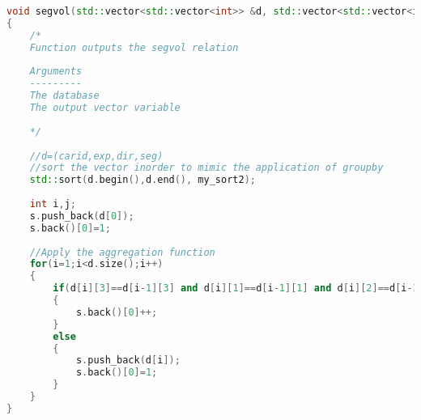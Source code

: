 \begin{lstlisting}[language=C++, caption=Calculating the SegVol relation, label={lst:SegVol}]
void segvol(std::vector<std::vector<int>> &d, std::vector<std::vector<int>> &s)
{   
    /*
    Function outputs the segvol relation
    
    Arguments
    ---------
    The database
    The output vector variable
    
    */
    
    //d=(carid,exp,dir,seg)
    //sort the vector inorder to mimic the application of groupby
    std::sort(d.begin(),d.end(), my_sort2);
    
    int i,j;
    s.push_back(d[0]);
    s.back()[0]=1;
    
    //Apply the aggregation function
    for(i=1;i<d.size();i++)
    {
        if(d[i][3]==d[i-1][3] and d[i][1]==d[i-1][1] and d[i][2]==d[i-1][2])
        {
            s.back()[0]++;
        }
        else
        {
            s.push_back(d[i]);
            s.back()[0]=1;
        }
    }
}
\end{lstlisting}

